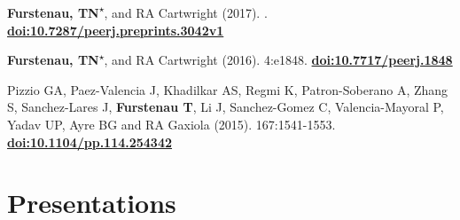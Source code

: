\documentclass[]{cv-style}          %
\begin{document}
\textbf{Furstenau, TN}\textsuperscript{$\star$}, and RA Cartwright (2017).  . \textbf{\href{| https://doi.org/10.7287/peerj.preprints.3042v1}{doi:10.7287/peerj.preprints.3042v1}}

\textbf{Furstenau, TN}\textsuperscript{$\star$}, and RA Cartwright (2016).   4:e1848. \textbf{\href{https://doi.org/10.7717/peerj.1848}{doi:10.7717/peerj.1848}}

Pizzio GA, Paez-Valencia J, Khadilkar AS, Regmi K, Patron-Soberano A, Zhang S, Sanchez-Lares J, \textbf{Furstenau T}, Li J, Sanchez-Gomez C, Valencia-Mayoral P, Yadav UP, Ayre BG and RA Gaxiola (2015).   167:1541-1553.\\ \textbf{\href{http://dx.doi.org/10.1104/pp.114.254342}{doi:10.1104/pp.114.254342}}

    

\section{Presentations}
\end{document}
